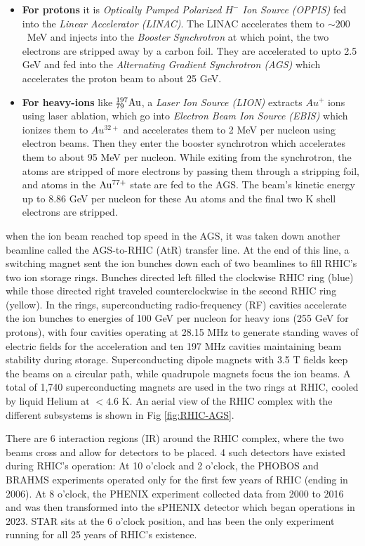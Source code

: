 \begin{itemize}
	\item \textbf{For protons} it is \emph{Optically Pumped Polarized \(H^-\) Ion Source (OPPIS)} fed into the \emph{Linear Accelerator (LINAC)}. The LINAC accelerates them to \(\sim 200\)~MeV and injects into the \emph{Booster Synchrotron} at which point, the two electrons are stripped away by a carbon foil. They are accelerated to upto 2.5 GeV and fed into the \emph{ Alternating Gradient Synchrotron (AGS)} which accelerates the proton beam to about 25 GeV.
	\item \textbf{For heavy-ions} like $\rm ^{197}_{79}Au$, a \emph{Laser Ion Source (LION)} extracts \(Au^+\) ions using laser ablation, which go into \emph{Electron Beam Ion Source (EBIS)} which ionizes them to \(Au^{32+}\) and accelerates them to 2 MeV per nucleon using electron beams.  Then they enter the booster synchrotron which accelerates them to about 95 MeV per nucleon. While exiting from the synchrotron, the atoms are stripped of more electrons by passing them through a stripping foil, and atoms in the $\rm Au^{77 + }$ state are fed to the AGS.  The beam's kinetic energy up to 8.86 GeV per nucleon for these Au atoms and the final two K shell electrons are stripped. 
\end{itemize}
when the ion beam reached top speed in the AGS, it was taken down another beamline called the AGS-to-RHIC (AtR) transfer line. At the end of this line, a switching magnet sent the ion bunches down each of two beamlines to fill RHIC's two ion storage rings. Bunches directed left filled the clockwise RHIC ring (blue) while those directed right traveled counterclockwise in the second RHIC ring (yellow). In the rings, superconducting radio-frequency (RF) cavities accelerate the ion bunches to energies of 100 GeV per nucleon for heavy ions (255 GeV for protons), with four cavities operating at 28.15 MHz to generate standing waves of electric fields for the acceleration and ten 197 MHz cavities maintaining beam stability during storage. Superconducting dipole magnets with 3.5 T fields keep the beams on a circular path, while quadrupole magnets focus the ion beams. A total of 1,740 superconducting magnets are used in the two rings at RHIC, cooled by liquid Helium at $< 4.6$ K. An aerial view of the RHIC complex with the different subsystems is shown in Fig \ref{fig:RHIC-AGS}. 

There are 6 interaction regions (IR) around the RHIC complex, where the two beams cross and allow for detectors to be placed. 4 such detectors have existed during RHIC's operation: At 10 o'clock and 2 o'clock, the PHOBOS and BRAHMS experiments operated only for the first few years of RHIC (ending in 2006). At 8 o’clock, the PHENIX experiment collected data from 2000 to 2016 and was then transformed into the sPHENIX detector which began operations in 2023. STAR sits at the 6 o'clock position, and has been the only experiment running for all 25 years of RHIC's existence.

